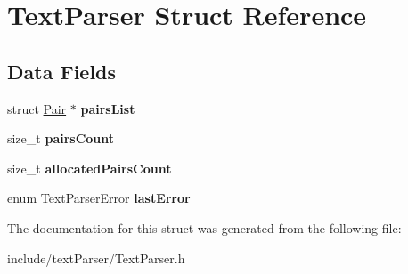 \hypertarget{struct_text_parser}{}\section{Text\+Parser Struct Reference}
\label{struct_text_parser}
\subsection*{Data Fields}
\begin{DoxyCompactItemize}
\item 
\hypertarget{struct_text_parser_a311aae354eec049861eb556c1b0e1776}{}\label{struct_text_parser_a311aae354eec049861eb556c1b0e1776} 
struct \hyperlink{struct_pair}{Pair} $\ast$ {\bfseries pairs\+List}
\item 
\hypertarget{struct_text_parser_a7a80ad9b6aca5708b96406da00437010}{}\label{struct_text_parser_a7a80ad9b6aca5708b96406da00437010} 
size\+\_\+t {\bfseries pairs\+Count}
\item 
\hypertarget{struct_text_parser_a0c09e3bb8d61dd466fa85b59029408b1}{}\label{struct_text_parser_a0c09e3bb8d61dd466fa85b59029408b1} 
size\+\_\+t {\bfseries allocated\+Pairs\+Count}
\item 
\hypertarget{struct_text_parser_aecb02976c4ac737d7ebe3a5e0b03977b}{}\label{struct_text_parser_aecb02976c4ac737d7ebe3a5e0b03977b} 
enum Text\+Parser\+Error {\bfseries last\+Error}
\end{DoxyCompactItemize}


The documentation for this struct was generated from the following file\+:\begin{DoxyCompactItemize}
\item 
include/text\+Parser/Text\+Parser.\+h\end{DoxyCompactItemize}
